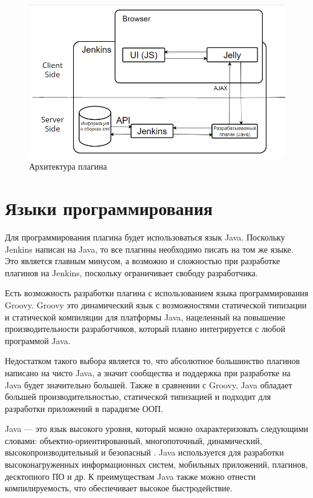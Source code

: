 \begin{figure}[ht!] 
	\center
	\includegraphics [scale=0.67] {my_folder/images//archpl3}
	\caption{Архитектура плагина} 
	\label{fig:ArchitecturePlugin}  
\end{figure}


\section{Языки программирования} \label{ch1:sec4}

Для программирования плагина будет использоваться язык Java. Поскольку Jenkins написан на Java, то все плагины необходимо писать на том же языке. Это является главным минусом, а возможно и сложностью при разработке плагинов на Jenkins, поскольку ограничивает свободу разработчика.

Есть возможность разработки плагина с использованием языка программирования Groovy. Groovy это динамический язык с возможностями статической типизации и статической компиляции для платформы Java\cite{groovy}, нацеленный на повышение производительности разработчиков, который плавно интегрируется с любой программой Java.

Недостатком такого выбора является то, что абсолютное большинство плагинов написано на чисто Java, а значит сообщества и поддержка при разработке на Java будет значительно большей. Также в сравнении с Groovy, Java обладает большей производительностью\cite{groovyvsjava}, статической типизацией и подходит для разработки приложений в парадигме ООП.

Java — это язык высокого уровня, который можно охарактеризовать следующими словами: объектно-ориентированный, многопоточный, динамический, высокопроизводительный и безопасный \cite{java}. Java используется для разработки высоконагруженных информационных систем, мобильных приложений, плагинов, десктопного ПО и др. К преимуществам Java также можно отнести компилируемость, что обеспечивает высокое быстродействие.

